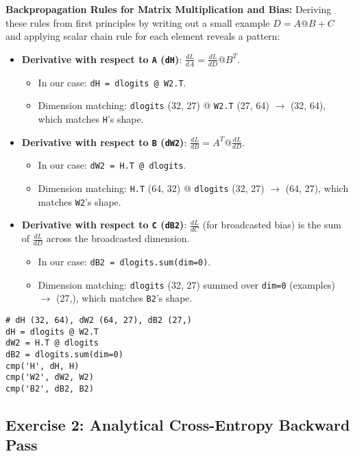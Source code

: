 \textbf{Backpropagation Rules for Matrix Multiplication and Bias:}
Deriving these rules from first principles by writing out a small example $D = A @ B + C$ and applying scalar chain rule for each element reveals a pattern:
\begin{itemize}
    \item \textbf{Derivative with respect to \texttt{A} (\texttt{dH})}: $\frac{dL}{dA} = \frac{dL}{dD} @ B^T$.
        \begin{itemize}
            \item In our case: \texttt{dH = dlogits @ W2.T}.
            \item Dimension matching: \texttt{dlogits} (32, 27) @ \texttt{W2.T} (27, 64) $\rightarrow$ (32, 64), which matches \texttt{H}'s shape.
        \end{itemize}
    \item \textbf{Derivative with respect to \texttt{B} (\texttt{dW2})}: $\frac{dL}{dB} = A^T @ \frac{dL}{dD}$.
        \begin{itemize}
            \item In our case: \texttt{dW2 = H.T @ dlogits}.
            \item Dimension matching: \texttt{H.T} (64, 32) @ \texttt{dlogits} (32, 27) $\rightarrow$ (64, 27), which matches \texttt{W2}'s shape.
        \end{itemize}
    \item \textbf{Derivative with respect to \texttt{C} (\texttt{dB2})}: $\frac{dL}{dC}$ (for broadcasted bias) is the sum of $\frac{dL}{dD}$ across the broadcasted dimension.
        \begin{itemize}
            \item In our case: \texttt{dB2 = dlogits.sum(dim=0)}.
            \item Dimension matching: \texttt{dlogits} (32, 27) summed over \texttt{dim=0} (examples) $\rightarrow$ (27,), which matches \texttt{B2}'s shape.
        \end{itemize}
\end{itemize}

\begin{lstlisting}[caption={Calculating dH, dW2, dB2}]
# dH (32, 64), dW2 (64, 27), dB2 (27,)
dH = dlogits @ W2.T
dW2 = H.T @ dlogits
dB2 = dlogits.sum(dim=0)
cmp('H', dH, H)
cmp('W2', dW2, W2)
cmp('B2', dB2, B2)
\end{lstlisting}

\subsection{Exercise 2: Analytical Cross-Entropy Backward Pass}

